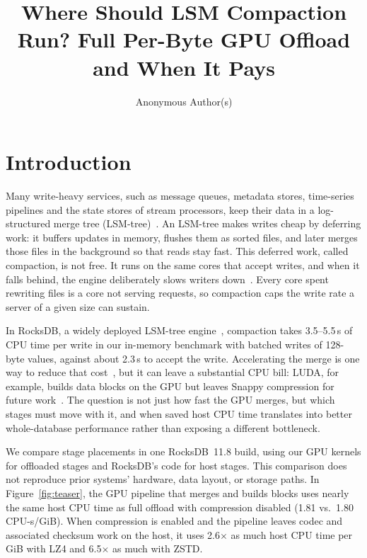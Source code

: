 \documentclass[sigconf, nonacm]{acmart}
\begin{document}
\title{Where Should LSM Compaction Run? Full Per-Byte GPU Offload and When It Pays}
\author{Anonymous Author(s)}
\maketitle

\section{Introduction}
\label{sec:intro}

Many write-heavy services, such as message queues, metadata stores, time-series pipelines
and the state stores of stream processors, keep their data in a log-structured merge tree
(LSM-tree)~\cite{oneil1996lsm,dong2021rocksdb}. An LSM-tree makes
writes cheap by deferring work: it buffers updates in memory, flushes them as sorted files,
and later merges those files in the background so that reads stay fast. This deferred work,
called compaction, is not free. It runs on the same cores that accept writes, and when it
falls behind, the engine deliberately slows writers down~\cite{silk2019,adoc2023}. Every
core spent rewriting files is a core not serving requests, so compaction caps the write
rate a server of a given size can sustain.

In RocksDB, a widely deployed LSM-tree engine~\cite{dong2021rocksdb}, compaction takes
3.5--5.5\,\textmu s of CPU time per write in our in-memory benchmark with batched writes
of 128-byte values, against about 2.3\,\textmu s to accept the write. Accelerating the
merge is one way to reduce that cost~\cite{fpga2020,luda2020,glsm2024,zhou2024msst,gparakv2025},
but it can leave a substantial CPU bill: LUDA, for example, builds data blocks on the
GPU but leaves Snappy compression for future work~\cite{luda2020}. The question is not
just how fast the GPU merges, but which stages must move with it, and when saved host
CPU time translates into better whole-database performance rather than exposing a
different bottleneck.

We compare stage placements in one RocksDB~11.8 build, using our GPU kernels for offloaded
stages and RocksDB's code for host stages. This comparison does not reproduce prior
systems' hardware, data layout, or storage paths. In Figure~\ref{fig:teaser}, the GPU
pipeline that merges and builds blocks uses nearly the same host CPU time as full offload
with compression disabled (1.81 vs.\ 1.80\,CPU-s/GiB). When compression is enabled and
the pipeline leaves codec and associated checksum work on the host, it uses 2.6$\times$
as much host CPU time per GiB with LZ4 and 6.5$\times$ as much with ZSTD.
\end{document}
